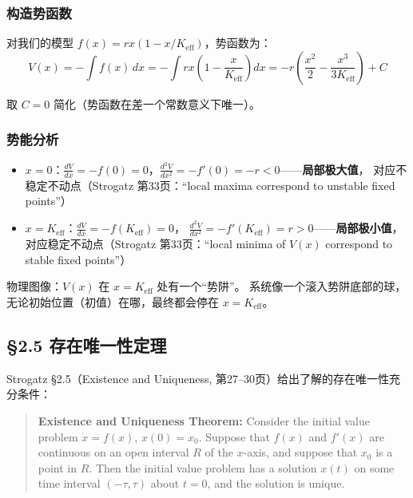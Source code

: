 \documentclass[12pt,a4paper]{article}
\begin{document}
\subsubsection{构造势函数}
对我们的模型 $f(x) = r x(1 - x/K_{\text{eff}})$，势函数为：
\begin{equation}
V(x) = -\int f(x)\,dx
      = -\int r x\left(1 - \frac{x}{K_{\text{eff}}}\right) dx
      = -r\left(\frac{x^2}{2} - \frac{x^3}{3K_{\text{eff}}}\right) + C
\end{equation}

取 $C = 0$ 简化（势函数在差一个常数意义下唯一）。

\subsubsection{势能分析}
\begin{itemize}
  \item $x = 0$：$\frac{dV}{dx} = -f(0) = 0$，$\frac{d^2V}{dx^2} = -f'(0) = -r < 0$——\textbf{局部极大值}，
        对应不稳定不动点（Strogatz 第33页：``local maxima correspond to unstable fixed points''）
  \item $x = K_{\text{eff}}$：$\frac{dV}{dx} = -f(K_{\text{eff}}) = 0$，
        $\frac{d^2V}{dx^2} = -f'(K_{\text{eff}}) = r > 0$——\textbf{局部极小值}，
        对应稳定不动点（Strogatz 第33页：``local minima of $V(x)$ correspond to stable fixed points''）
\end{itemize}

物理图像：$V(x)$ 在 $x = K_{\text{eff}}$ 处有一个``势阱''。
系统像一个滚入势阱底部的球，无论初始位置（初值）在哪，最终都会停在 $x = K_{\text{eff}}$。

\subsection{\S2.5 存在唯一性定理}

Strogatz \S2.5（Existence and Uniqueness, 第27--30页）给出了解的存在唯一性充分条件：

\begin{quote}
\small
\textbf{Existence and Uniqueness Theorem:} Consider the initial value problem $\dot{x} = f(x)$,
$x(0) = x_0$. Suppose that $f(x)$ and $f'(x)$ are continuous on an open interval $R$ of the
$x$-axis, and suppose that $x_0$ is a point in $R$. Then the initial value problem has a
solution $x(t)$ on some time interval $(-\tau, \tau)$ about $t = 0$, and the solution is unique.
\end{quote}
\end{document}
